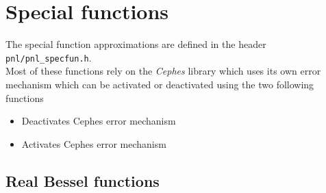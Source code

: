 \section{Special functions}

The special function approximations are defined in the header \verb!pnl/pnl_specfun.h!.\\

Most of these functions rely on the {\it Cephes} library which uses its own
error mechanism which can be activated or deactivated using the two following
functions
\begin{itemize}
  \item {}
    \sshortdescribe Deactivates Cephes error mechanism
  \item {}
    \sshortdescribe Activates Cephes error mechanism
\end{itemize}


\subsection{Real Bessel functions}

